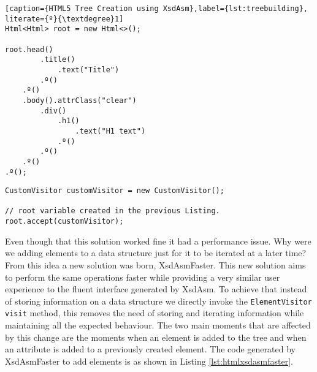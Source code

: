 \bigskip


\begin{minipage}{\linewidth}
\begin{lstlisting}[caption={HTML5 Tree Creation using XsdAsm},label={lst:treebuilding}, literate={º}{\textdegree}1]
Html<Html> root = new Html<>();

root.head()
        .title()
            .text("Title")
        .º()
    .º()
    .body().attrClass("clear")
        .div()
        	.h1()
        		.text("H1 text")
        	.º()
        .º()
    .º()
.º();
\end{lstlisting}
\end{minipage}

\bigskip


\begin{minipage}{\linewidth}
\begin{lstlisting}[caption={HTML5 Tree Visit using XsdAsm},label={lst:treevisit}]
CustomVisitor customVisitor = new CustomVisitor();

// root variable created in the previous Listing.
root.accept(customVisitor);
\end{lstlisting}
\end{minipage}

\noindent
Even though that this solution worked fine it had a performance issue. Why were we adding elements to a data structure just for it to be iterated at a later time? From this idea a new solution was born, XsdAsmFaster. This new solution aims to perform the same operations faster while providing a very similar user experience to the fluent interface generated by XsdAsm. To achieve that instead of storing information on a data structure we directly invoke the \texttt{ElementVisitor visit} method, this removes the need of storing and iterating information while maintaining all the expected behaviour. The two main moments that are affected by this change are the moments when an element is added to the tree and when an attribute is added to a previously created element. The code generated by XsdAsmFaster to add elements is as shown in Listing \ref{lst:htmlxsdasmfaster}.

\bigskip


